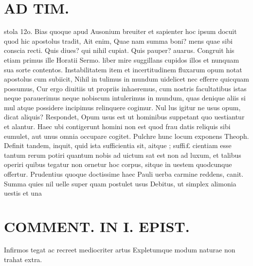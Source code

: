 \documentclass{article}
\begin{document}
\begin{pages}
\section*{AD TIM. }
\marginpar{[ p.168 ]}\pstart stola 12o. Bias quoque apud Ausonium breuiter et sapienter hoc ipsum docuit quod hic apostolus tradit, Ait enim, Quae nam summa boni? mens quae sibi conscia recti. Quis diues? qui nihil cupiat. Quis pauper? auarus. Congruit his etiam primus ille Horatii Sermo. liber mire suggillans cupidos illos et nunquam sua sorte contentos. Instabilitatem item et incertitudinem fluxarum opum notat apostolus cum subiicit, Nihil in tulimus in mundum uidelicet nec efferre quicquam possumus, Cur ergo diuitiis ut propriis inhaeremus, cum nostris facultatibus istas neque parauerimus neque  nobiscum intulerimus in mundum, quas denique aliis si mul atque possidere incipimus relinquere cogimur. Nul lus igitur ne usus opum, dicat aliquis? Respondet, Opum usus est ut hominibus suppetant quo uestiantur et alantur. Haec ubi contigerunt homini non est quod frau datis reliquis sibi eumulet, aut unus omnia occupare cogitet. Pulchre hunc locum exponens Theoph. Definit tandem, inquit, quid ista sufficientia sit, aitque ; suffi£ cientiam esse tantum rerum potiri quantum nobis ad uictum sat est non ad luxum, et talibus operiri quibus tegatur non ornetur hoc corpus, sitque in uestem quodcunque offertur. Prudentius quoque doctissime haec Pauli uerba carmine reddens, canit.  \pend\pstart Summa quies nil uelle super quam postulet usus Debitus, ut simplex alimonia uestis et una  \pend
\section*{COMMENT. IN I. EPIST. }\pstart Infirmos tegat ac recreet mediocriter artus Expletumque modum naturae non trahat extra.  \pend
{}
{}

\end{pages}
\end{document}
